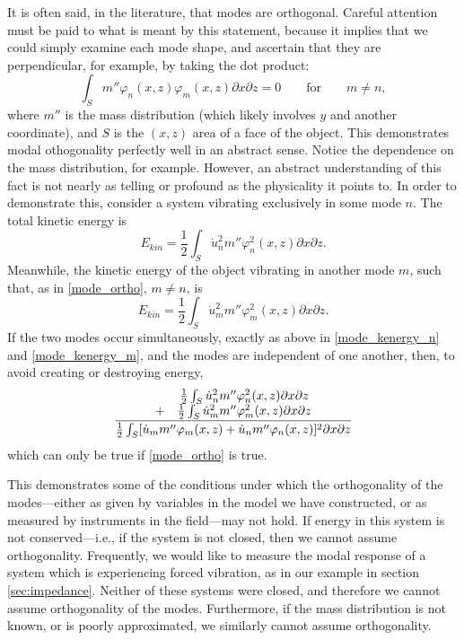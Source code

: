 \documentclass[a4paper,10pt]{report}
\numberwithin{equation}{section}
\begin{document}
It is often said, in the literature, that modes are orthogonal. Careful attention must be paid to what is meant by this statement, because it implies that we could simply examine each mode shape, and ascertain that they are perpendicular, for example, by taking the dot product\cite[p.~320]{Cremer1973}:
\begin{equation}\label{mode_ortho}
\int_S m'' \varphi_n(x,z) \varphi_m(x,z) \partial x \partial z = 0 \qquad \text{for} \qquad m \neq n ,
\end{equation}
where $m''$ is the mass distribution (which likely involves $y$ and another coordinate), and $S$ is the $(x, z)$ area of a face of the object. This demonstrates modal othogonality perfectly well in an abstract sense. Notice the dependence on the mass distribution, for example. However, an abstract understanding of this fact is not nearly as telling or profound as the physicality it points to. In order to demonstrate this, consider a system vibrating exclusively in some mode $n$. The total kinetic energy is \cite[p.~320]{Cremer1973}
\begin{equation}\label{mode_kenergy_n}
E_{kin} = \frac{1}{2} \int_S \dot{u}_n^2 m'' \varphi_n^2(x, z) \partial x \partial z \text{.}
\end{equation}
Meanwhile, the kinetic energy of the object vibrating in another mode $m$, such that, as in \eqref{mode_ortho}, $m \neq n$, is
\begin{equation}\label{mode_kenergy_m}
E_{kin} = \frac{1}{2} \int_S \dot{u}_m^2 m'' \varphi_m^2(x, z) \partial x \partial z \text{.}
\end{equation}
If the two modes occur simultaneously, exactly as above in \eqref{mode_kenergy_n} and \eqref{mode_kenergy_m}, and the modes are independent of one another, then, to avoid creating or destroying energy,
\begin{align}
\frac{
\begin{array}{c c}
&\frac{1}{2} \int_S \dot{u}_n^2 m'' \varphi_n^2(x, z) \partial x \partial z\\
+ &\frac{1}{2} \int_S \dot{u}_m^2 m'' \varphi_m^2(x, z) \partial x \partial z 
\end{array}
}{
\frac{1}{2}  \int_S [\dot{u}_m m'' \varphi_m(x, z) + \dot{u}_n m'' \varphi_n(x, z) ]^2 \partial x \partial z  
}
\end{align}
which can only be true if \eqref{mode_ortho} is true. \cite[p.~322]{Cremer1973}

This demonstrates some of the conditions under which the orthogonality of the modes---either as given by variables in the model we have constructed, or as measured by instruments in the field---may not hold. If energy in this system is not conserved---i.e., if the system is not closed, then we cannot assume orthogonality. Frequently, we would like to measure the modal response of a system which is experiencing forced vibration, as in our example in section \ref{sec:impedance}. Neither of these systems were closed, and therefore we cannot assume orthogonality of the modes. Furthermore, if the mass distribution is not known, or is poorly approximated, we similarly cannot assume orthogonality. 
\end{document}
